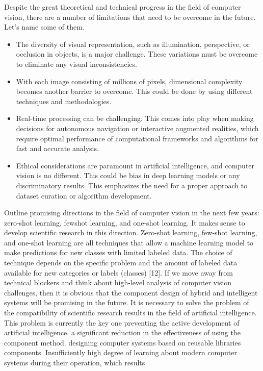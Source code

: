 \documentclass{article}
\begin{document}
\begin{multicols}{2}
Despite the great theoretical and technical progress
in the field of computer vision, there are a number of
limitations that need to be overcome in the future. Let’s
name some of them.
\begin{itemize}[noitemsep]
\item  The diversity of visual representation, such as illumination, perspective, or occlusion in objects, is a
major challenge. These variations must be overcome
to eliminate any visual inconsistencies.
\item  With each image consisting of millions of pixels,
dimensional complexity becomes another barrier to
overcome. This could be done by using different
techniques and methodologies.
\item  Real-time processing can be challenging. This
comes into play when making decisions for autonomous navigation or interactive augmented realities, which require optimal performance of computational frameworks and algorithms for fast and
accurate analysis.
\item  Ethical considerations are paramount in artificial
intelligence, and computer vision is no different.
This could be bias in deep learning models or any
discriminatory results. This emphasizes the need for
a proper approach to dataset curation or algorithm
development.
\end{itemize}
Outline promising directions in the field of computer
vision in the next few years: zero-shot learning, fewshot learning, and one-shot learning. It makes sense to
develop scientific research in this direction. Zero-shot
learning, few-shot learning, and one-shot learning are all
techniques that allow a machine learning model to make
predictions for new classes with limited labeled data. The
choice of technique depends on the specific problem and
the amount of labeled data available for new categories
or labels (classes) [12].
If we move away from technical blockers and think
about high-level analysis of computer vision challenges,
then it is obvious that the component design of hybrid
and intelligent systems will be promising in the future. It
is necessary to solve the problem of the compatibility of
scientific research results in the field of artificial intelligence. This problem is currently the key one preventing
the active development of artificial intelligence.
a significant reduction in the effectiveness of using the
component method. designing computer systems based
on reusable libraries components.
Insufficiently high degree of learning about modern
computer systems during their operation, which results

\end{multicols}
\end{document}
